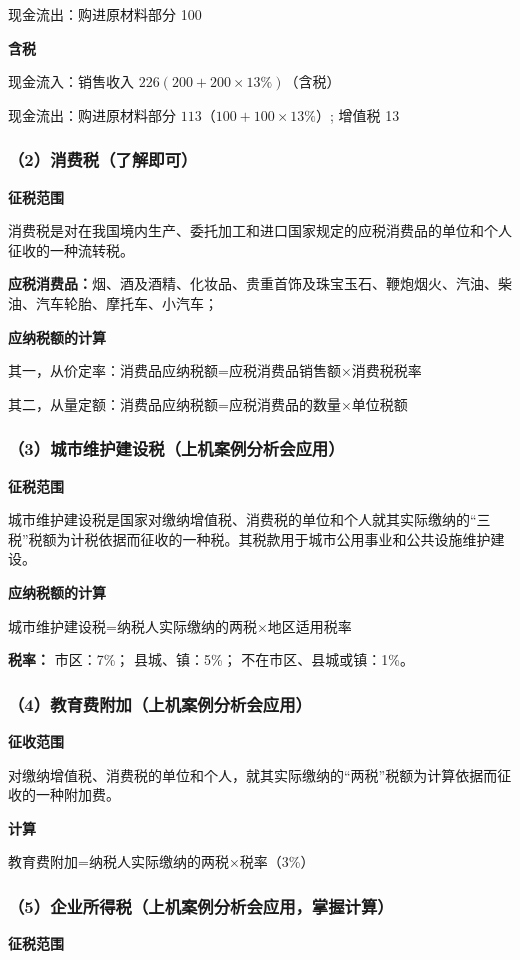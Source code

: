现金流出：购进原材料部分 100

\noindent \textbf{含税}

现金流入：销售收入 $226(200+200 \times 13\%)$（含税）

现金流出：购进原材料部分 $113（100+100 \times 13\%）$;
增值税 13

\subsubsection{（2）消费税（了解即可）}
\textbf{征税范围}

消费税是对在我国境内生产、委托加工和进口国家规定的应税消费品的单位和个人征收的一种流转税。

\textbf{应税消费品：}烟、酒及酒精、化妆品、贵重首饰及珠宝玉石、鞭炮烟火、汽油、柴油、汽车轮胎、摩托车、小汽车；

\textbf{应纳税额的计算}

其一，从价定率：消费品应纳税额=应税消费品销售额×消费税税率

其二，从量定额：消费品应纳税额=应税消费品的数量×单位税额

\subsubsection{（3）城市维护建设税（上机案例分析会应用）}
\textbf{征税范围}

城市维护建设税是国家对缴纳增值税、消费税的单位和个人就其实际缴纳的“三税”税额为计税依据而征收的一种税。其税款用于城市公用事业和公共设施维护建设。

\textbf{应纳税额的计算}

城市维护建设税=纳税人实际缴纳的两税×地区适用税率

\textbf{税率：}
市区：7\%；
县城、镇：5\%；
不在市区、县城或镇：1\%。
\subsubsection{（4）教育费附加（上机案例分析会应用）}
\textbf{征收范围}

对缴纳增值税、消费税的单位和个人，就其实际缴纳的“两税”税额为计算依据而征收的一种附加费。

\textbf{计算}

教育费附加=纳税人实际缴纳的两税×税率（3\%）

\subsubsection{（5）企业所得税（上机案例分析会应用，掌握计算）}
\textbf{征税范围}

